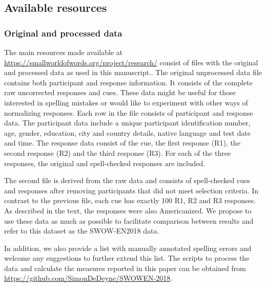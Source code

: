 \documentclass[a4paper,doc,natbib,floatsintext]{apa6}
\begin{document}
\begin{appendix}
\subsection{Available resources}

\subsubsection{Original and processed data}
The main resources made available at \url{https://smallworldofwords.org/project/research/} consist of files with the original and processed data as used in this manuscript..
The original unprocessed data file contains both participant and response information. It consists of the complete raw uncorrected responses and cues. These data might be useful for those interested in spelling mistakes or would like to experiment with other ways of normalizing responses.
Each row in the file consists of participant and response data. The participant data include a unique participant identification number, age, gender, education, city and country details, native language and test date and time. The response data consist of the cue, the first response (R1), the second response (R2) and the third response (R3). For each of the three responses, the original and spell-checked responses are included.

The second file is derived from the raw data and consists of spell-checked cues and responses after removing participants that did not meet selection criteria. In contrast to the previous file, each cue has exactly 100 R1, R2 and R3 responses.  As described in the text, the responses were also Americanized. We propose to use these data as much as possible to facilitate comparison between results and refer to this dataset as the SWOW-EN2018 data.

In addition, we also provide a list with manually annotated spelling errors and welcome any suggestions to further extend this list. The scripts to process the data and calculate the measures reported in this paper can be obtained from \url{https://github.com/SimonDeDeyne/SWOWEN-2018}.

\end{appendix}

\end{document}
